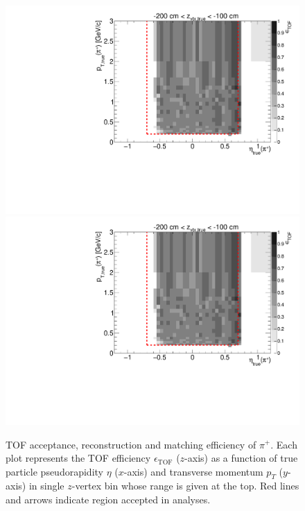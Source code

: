 \begin{figure}[hb]
\caption[TOF acceptance, reconstruction and matching efficiency of $\pi^{+}$.]{TOF acceptance, reconstruction and matching efficiency of $\pi^{+}$. Each plot represents the TOF efficiency $\epsilon_{\text{TOF}}$ ($z$-axis) as a function of true particle pseudorapidity $\eta$ ($x$-axis) and transverse momentum $p_{T}$ ($y$-axis) in single $z$-vertex bin whose range is given at the top. Red lines and arrows indicate region accepted in analyses.}\label{fig:eff_pion_plus}
\centering
\parbox{0.495\textwidth}{
  \centering
  \includegraphics[width=\linewidth,page=3]{graphics/eff/Eff2D_TOF_pion_Plus.pdf}\\
  \includegraphics[width=\linewidth,page=5]{graphics/eff/Eff2D_TOF_pion_Plus.pdf}\\
}
\end{figure}
